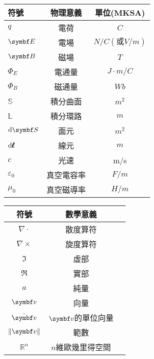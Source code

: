 \begin{table}[!htbp]
    \centering
    \begin{tabular}{lcc}
        \toprule
        符號              & 物理意義   & 單位(MKSA)           \\
        \midrule
        $q$               & 電荷       & $\unit{C}$           \\
        $\va{E}$          & 電場       & $\unit{N/C(或V/m)}$  \\
        $\va{B}$          & 磁場       & $\unit{T}$           \\
        $\Phi_E$          & 電通量     & $\unit{J\cdot m /C}$ \\
        $\Phi_B$          & 磁通量     & $\unit{Wb}$          \\
        $\mathbb{S}$      & 積分曲面   & $\unit{m^2}$         \\
        $\mathbb{L}$      & 積分環路   & $\unit{m}$           \\
        $\dif \va{S}$     & 面元       & $\unit{m^2}$         \\
        $\mathop{}\!\mathrm{d} \pmb{\ell}$ & 線元       & $\unit{m}$           \\
        $c$               & 光速       & m/s                  \\
        $\varepsilon_0$   & 真空電容率 & $\unit{F/m}$         \\
        $\mu_0$           & 真空磁導率 & $\unit{H/m}$         \\
        \bottomrule
    \end{tabular}
\end{table}

\begin{table}[!htbp]
    \centering
    \begin{tabular}{ccc}
        \toprule
        符號            & 數學意義           \\
        \midrule
        $\nabla \cdot$  & 散度算符           \\
        $\nabla \times$ & 旋度算符           \\
        $\Im$           & 虛部               \\
        $\Re$           & 實部               \\
        $a$             & 純量               \\
        $\va{v}$        & 向量               \\
        $\vu{v}$        & $\va{v}$的單位向量 \\
        $\norm{\va{v}}$ & 範數               \\
        $\mathbb{R}^n$  & $n$維歐幾里得空間  \\
        \bottomrule
    \end{tabular}
\end{table}
